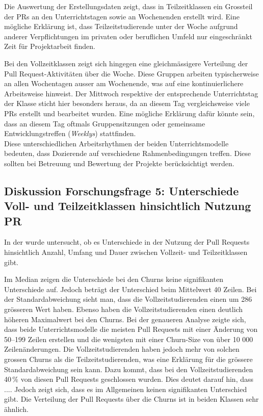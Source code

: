 Die Auswertung der Erstellungsdaten zeigt, dass in Teilzeitklassen ein Grossteil der PRs an den Unterrichtstagen sowie an Wochenenden erstellt wird. Eine mögliche Erklärung ist, dass Teilzeitstudierende unter der Woche aufgrund anderer Verpflichtungen im privaten oder beruflichen Umfeld nur eingeschränkt Zeit für Projektarbeit finden.

Bei den Vollzeitklassen zeigt sich hingegen eine gleichmässigere Verteilung der Pull Request-Aktivitäten über die Woche. Diese Gruppen arbeiten typischerweise an allen Wochentagen ausser am Wochenende, was auf eine kontinuierlichere Arbeitsweise hinweist. Der Mittwoch respektive der entsprechende Unterrichtstag der Klasse sticht hier besonders heraus, da an diesem Tag vergleichsweise viele PRs erstellt und bearbeitet wurden. Eine mögliche Erklärung dafür könnte sein, dass an diesem Tag oftmals Gruppensitzungen oder gemeinsame Entwicklungstreffen (\textit{Weeklys}) stattfinden. \\
Diese unterschiedlichen Arbeitsrhythmen der beiden Unterrichtsmodelle bedeuten, dass Dozierende auf verschiedene Rahmenbedingungen treffen. Diese sollten bei Betreuung und Bewertung der Projekte berücksichtigt werden.

\subsection{Diskussion Forschungsfrage 5: Unterschiede Voll- und Teilzeitklassen hinsichtlich Nutzung PR}
In der  wurde untersucht, ob es Unterschiede in der Nutzung der Pull Requests hinsichtlich Anzahl, Umfang und Dauer zwischen Vollzeit- und Teilzeitklassen gibt.

Im Median zeigen die Unterschiede bei den Churns keine signifikanten Unterschiede auf. Jedoch beträgt der Unterschied beim Mittelwert 40 Zeilen. Bei der Standardabweichung sieht man, dass die Vollzeitstudierenden einen um 286 grösseren Wert haben. Ebenso haben die Vollzeitstudierenden einen deutlich höheren Maximalwert bei den Churns. Bei der genaueren Analyse zeigte sich, dass beide Unterrichtsmodelle die meisten Pull Requests mit einer Änderung von 50–199 Zeilen erstellen und die wenigsten mit einer Churn-Size von über 10 000 Zeilenänderungen. Die Vollzeitstudierenden haben jedoch mehr von solchen grossen Churns als die Teilzeitstudierenden, was eine Erklärung für die grössere Standardabweichung sein kann. Dazu kommt, dass bei den Vollzeitstudierenden 40\,\% von diesen Pull Requests geschlossen wurden. Dies deutet darauf hin, dass .... Jedoch zeigt sich, dass es im Allgemeinen keinen signifikanten Unterschied gibt. Die Verteilung der Pull Requests über die Churns ist in beiden Klassen sehr ähnlich. 

